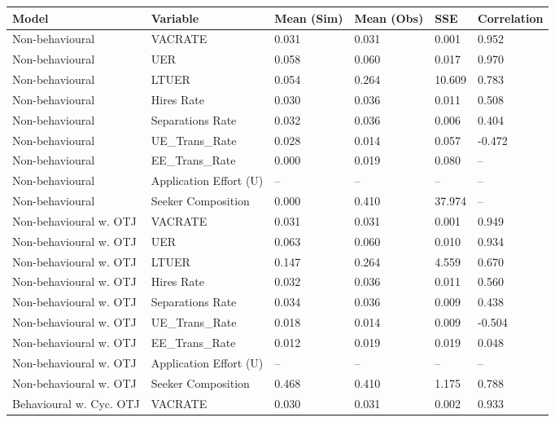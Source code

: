 \begin{table}[ht]
\centering
\begin{adjustbox}{width=\textwidth}
\begin{tabular}{llllll}
\toprule
Model & Variable & Mean (Sim) & Mean (Obs) & SSE & Correlation \\
\midrule
Non-behavioural & VACRATE & \cellcolor{yellow!25}0.031 & 0.031 & \cellcolor{yellow!25}0.001 & \cellcolor{yellow!25}0.952 \\
Non-behavioural & UER & \cellcolor{yellow!25}0.058 & 0.060 & 0.017 & \cellcolor{yellow!25}0.970 \\
Non-behavioural & LTUER & 0.054 & 0.264 & 10.609 & \cellcolor{yellow!25}0.783 \\
Non-behavioural & Hires Rate & 0.030 & 0.036 & \cellcolor{yellow!25}0.011 & 0.508 \\
Non-behavioural & Separations Rate & 0.032 & 0.036 & \cellcolor{yellow!25}0.006 & 0.404 \\
Non-behavioural & UE_Trans_Rate & 0.028 & 0.014 & 0.057 & -0.472 \\
Non-behavioural & EE_Trans_Rate & 0.000 & 0.019 & 0.080 & -- \\
Non-behavioural & Application Effort (U) & -- & -- & -- & -- \\
Non-behavioural & Seeker Composition & 0.000 & 0.410 & 37.974 & -- \\
Non-behavioural w. OTJ & VACRATE & 0.031 & 0.031 & 0.001 & 0.949 \\
Non-behavioural w. OTJ & UER & 0.063 & 0.060 & \cellcolor{yellow!25}0.010 & 0.934 \\
Non-behavioural w. OTJ & LTUER & 0.147 & 0.264 & 4.559 & 0.670 \\
Non-behavioural w. OTJ & Hires Rate & \cellcolor{yellow!25}0.032 & 0.036 & 0.011 & 0.560 \\
Non-behavioural w. OTJ & Separations Rate & \cellcolor{yellow!25}0.034 & 0.036 & 0.009 & 0.438 \\
Non-behavioural w. OTJ & UE_Trans_Rate & 0.018 & 0.014 & 0.009 & -0.504 \\
Non-behavioural w. OTJ & EE_Trans_Rate & \cellcolor{yellow!25}0.012 & 0.019 & 0.019 & 0.048 \\
Non-behavioural w. OTJ & Application Effort (U) & -- & -- & -- & -- \\
Non-behavioural w. OTJ & Seeker Composition & 0.468 & 0.410 & 1.175 & 0.788 \\
Behavioural w. Cyc. OTJ & VACRATE & 0.030 & 0.031 & 0.002 & 0.933 \\

\end{tabular}
\end{adjustbox}
\end{table}

